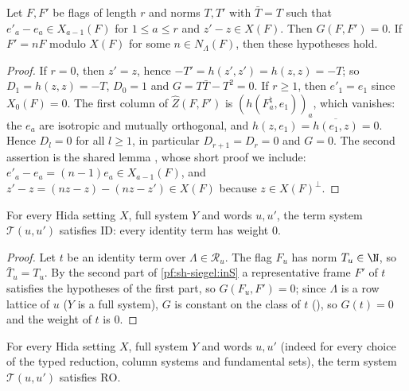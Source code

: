 \begin{lemma}\label{pf:sh-siegel:inS}
Let $F,F'$ be flags of length $r$ and norms $T,T'$ with $\bar T=T$ such that $e'_a-e_a\in X_{a-1}(F)$ for $1\le a\le r$ and
$z'-z\in X(F)$. Then $G(F,F')=0$. If $F'=nF$ modulo $X(F)$ for some $n\in N_\Lambda(F)$, then these hypotheses hold.
\end{lemma}

\begin{proof}
If $r=0$, then $z'=z$, hence $-T'=h(z',z')=h(z,z)=-T$; so $D_1=h(z,z)=-T$, $D_0=1$ and $G=T\bar T-T^2=0$. If $r\ge1$, then
$e'_1=e_1$ since $X_0(F)=0$. The first column of $\widehat Z(F,F')$ is $(h(F^\natural_a,e_1))_a$, which vanishes: the $e_a$
are isotropic and mutually orthogonal, and $h(z,e_1)=\overline{h(e_1,z)}=0$. Hence $D_l=0$ for all $l\ge1$, in particular
$D_{r+1}=D_r=0$ and $G=0$. The second assertion is the shared lemma , whose
short proof we include: $e'_a-e_a=(n-1)e_a\in X_{a-1}(F)$, and
$z'-z=(nz-z)-(nz-z')\in X(F)$ because $z\in X(F)^\perp$.
\end{proof}

\begin{proposition}\label{pf:sh-siegel:iddeg}
For every Hida setting $X$, full system $Y$ and words $u,u'$, the term system $\mathcal T(u,u')$ satisfies $\mathrm{ID}$:
every identity term has weight $0$.
\end{proposition}

\begin{proof}
Let $t$ be an identity term over $\Lambda\in\mathcal R_u$. The flag $F_u$ has norm $T_u\in\N$, so $\bar T_u=T_u$. By the second
part of \cref{pf:sh-siegel:inS} a representative frame $F'$ of $t$ satisfies the hypotheses of the first part, so
$G(F_u,F')=0$; since $\Lambda$ is a row lattice of $u$ ($Y$ is a full system), $G$ is constant on the class of $t$
(), so $G(t)=0$ and the weight of $t$ is $0$.
\end{proof}

\begin{proposition}\label{pf:sh-siegel:roworth}
For every Hida setting $X$, full system $Y$ and words $u,u'$ (indeed for every choice of the typed reduction, column systems
and fundamental sets), the term system $\mathcal T(u,u')$ satisfies $\mathrm{RO}$.
\end{proposition}

